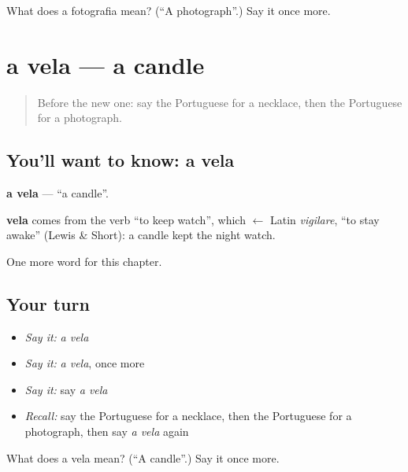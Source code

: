\begin{tcolorbox}[breakable,colback=teal!4,colframe=teal!35!black,title={Before you move on}]
What does a fotografia mean? (\textquotedblleft{}A photograph\textquotedblright{}.) Say it once more.
\end{tcolorbox}
\section[a vela]{a vela — a candle}

\label{lesson:PT-C101-vela}



\begin{quote}
Before the new one: say the Portuguese for a necklace, then the Portuguese for a photograph.
\end{quote}

\subsection*{You'll want to know: a vela}
\textbf{a vela} — \textquotedblleft{}a candle\textquotedblright{}.

\begin{cousinweb}
\textbf{vela} comes from the verb \textquotedblleft{}to keep watch\textquotedblright{}, which $\leftarrow$ Latin \emph{vigilare}, \textquotedblleft{}to stay awake\textquotedblright{} (Lewis \& Short): a candle kept the night watch.
\end{cousinweb}

\begin{grammarlens}[title={What you've built}]
One more word for this chapter.
\end{grammarlens}

\subsection*{Your turn}
\begin{itemize}
\raggedright
  \item \emph{Say it:} \emph{a vela}
  \item \emph{Say it:} \emph{a vela}, once more
  \item \emph{Say it:} say \emph{a vela}
  \item \emph{Recall:} say the Portuguese for a necklace, then the Portuguese for a photograph, then say \emph{a vela} again
\end{itemize}

\begin{tcolorbox}[breakable,colback=teal!4,colframe=teal!35!black,title={Before you move on}]
What does a vela mean? (\textquotedblleft{}A candle\textquotedblright{}.) Say it once more.
\end{tcolorbox}
